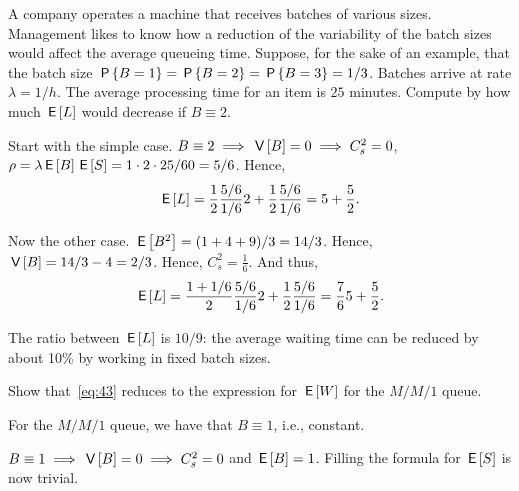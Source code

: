 \documentclass[queueing-book.tex]{subfiles}
\begin{document}
\begin{exercise}\label{ex:64}
A company operates a machine that receives batches of various sizes.
Management likes to know how a reduction of the variability of the batch sizes would affect the average queueing time.
Suppose, for the sake of an example, that the batch size $\P{B=1} = \P{B=2} = \P{B=3} = 1/3$.
Batches arrive at rate $\lambda = 1/h$.
The average processing time for an item is $25$ minutes.
Compute by how much $\E\L$ would decrease if $B\equiv 2$.
\begin{solution}

 Start with the simple case.
 $B\equiv 2 \implies \V B=0 \implies C_s^2 = 0$,  $\rho=\lambda \E B \E S = 1\cdot 2 \cdot 25/60 = 5/6$. Hence,
 \begin{equation*}
 \E{\L} = \frac 12 \frac{5/6}{1/6} 2 + \frac 12 \frac{5/6}{1/6} = 5 + \frac52.
 \end{equation*}

Now the other case. $\E{B^2} = (1+4+9)/3 = 14/3$. Hence, $\V B=14/3 - 4=2/3$. Hence,
$C_s^2= \frac 16$.
And thus,
 \begin{equation*}
 \E{\L} = \frac {1+1/6}2 \frac{5/6}{1/6} 2 + \frac 12 \frac{5/6}{1/6} = \frac76 5 + \frac 52.
 \end{equation*}

 The ratio between $\E{\L}$ is $10/9$:  the average waiting time can be reduced by about  10\%  by working in fixed batch sizes.
\end{solution}
\end{exercise}


\begin{exercise}
Show that~\cref{eq:43} reduces to the expression for $\E W$ for the $M/M/1$ queue.
\begin{hint}
For the $M/M/1$ queue, we have that $B\equiv 1$, i.e., constant. %
\end{hint}
\begin{solution}
$B\equiv 1 \implies \V B = 0 \implies C_{s}^{2} =0$ and $\E B = 1$. Filling the formula for $\E S$ is now trivial.
\end{solution}
\end{exercise}
\end{document}
